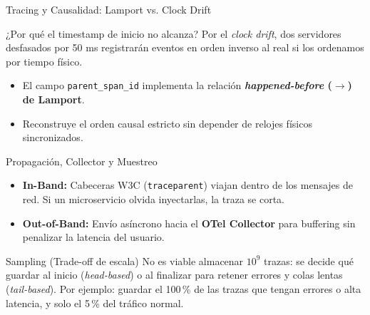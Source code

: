 \documentclass[institutional,screen,none]{../cls/ua-engineering-v6-beamer}
\begin{document}



\begin{frame}{Tracing y Causalidad: Lamport vs. Clock Drift}
\begin{block}{¿Por qué el timestamp de inicio no alcanza?}
Por el \emph{clock drift}, dos servidores desfasados por 50 ms registrarán eventos en orden inverso al real si los ordenamos por tiempo físico.
\end{block}

\pause

\begin{itemize}
\item El campo \texttt{parent\_span\_id} implementa la relación \textbf{\emph{happened-before} ($\rightarrow$) de Lamport}.
\item Reconstruye el orden causal estricto sin depender de relojes físicos sincronizados.
\end{itemize}
\end{frame}

\begin{frame}{Propagación, Collector y Muestreo}
\begin{itemize}
\item \textbf{In-Band:} Cabeceras W3C (\texttt{traceparent}) viajan dentro de los mensajes de red. Si un microservicio olvida inyectarlas, la traza se corta.
\item \textbf{Out-of-Band:} Envío asíncrono hacia el \textbf{OTel Collector} para buffering sin penalizar la latencia del usuario.
\end{itemize}

\pause

\begin{block}{Sampling (Trade-off de escala)}
No es viable almacenar $10^9$ trazas: se decide qué guardar al inicio (\emph{head-based}) o al finalizar para retener errores y colas lentas (\emph{tail-based}). Por ejemplo: guardar el 100\,\% de las trazas que tengan errores o alta latencia, y solo el 5\,\% del tráfico normal.
\end{block}
\end{frame}
\end{document}
